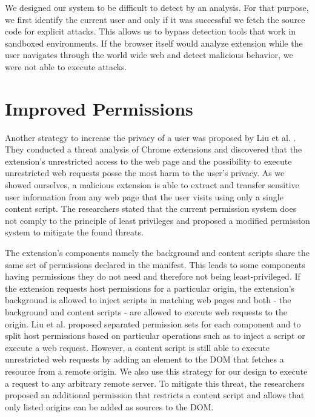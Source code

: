 	We designed our system to be difficult to detect by an analysis. For that purpose, we first identify the current user and only if it was successful we fetch the source code for explicit attacks. This allows us to bypass detection tools that work in sandboxed environments. If the browser itself would analyze extension while the user navigates through the world wide web and detect malicious behavior, we were not able to execute attacks.

\section{Improved Permissions}
\label{sec:improvedPermissions}

	Another strategy to increase the privacy of a user was proposed by Liu et al. \cite{Liu12chromeextensions:}. They conducted a threat analysis of Chrome extensions and discovered that the extension's unrestricted access to the web page and the possibility to execute unrestricted web requests posse the most harm to the user's privacy. As we showed ourselves, a malicious extension is able to extract and transfer sensitive user information from any web page that the user visits using only a single content script. The researchers stated that the current permission system does not comply to the principle of least privileges and proposed a modified permission system to mitigate the found threats. 
	
	The extension's components namely the background and content scripts share the same set of permissions declared in the manifest. This leads to some components having permissions they do not need and therefore not being least-privileged. If the extension requests host permissions for a particular origin, the extension's background is allowed to inject scripts in matching web pages and both - the background and content scripts - are allowed to execute web requests to the origin. Liu et al. proposed separated permission sets for each component and to split host permissions based on particular operations such as to inject a script or execute a web request. However, a content script is still able to execute unrestricted web requests by adding an element to the DOM that fetches a resource from a remote origin. We also use this strategy for our design to execute a request to any arbitrary remote server. To mitigate this threat, the researchers proposed an additional permission that restricts a content script and allows that only listed origins can be added as sources to the DOM.
	
